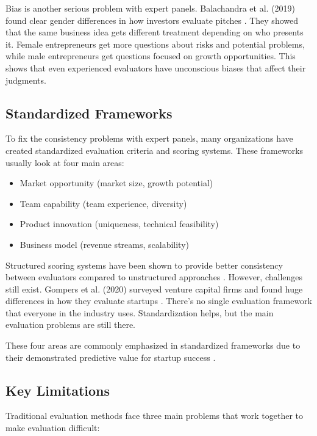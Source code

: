 Bias is another serious problem with expert panels. Balachandra et al. (2019) found clear gender differences in how investors evaluate pitches \cite{Balachandra2019}. They showed that the same business idea gets different treatment depending on who presents it. Female entrepreneurs get more questions about risks and potential problems, while male entrepreneurs get questions focused on growth opportunities. This shows that even experienced evaluators have unconscious biases that affect their judgments.

\subsection{Standardized Frameworks}\label{subsec:standardized-frameworks}
To fix the consistency problems with expert panels, many organizations have created standardized evaluation criteria and scoring systems. These frameworks usually look at four main areas:
\begin{itemize}
    \item Market opportunity (market size, growth potential)
    \item Team capability (team experience, diversity)
    \item Product innovation (uniqueness, technical feasibility)
    \item Business model (revenue streams, scalability)
\end{itemize}

Structured scoring systems have been shown to provide better consistency between evaluators compared to unstructured approaches \cite{Tsay2021VISUALSDI}. However, challenges still exist. Gompers et al. (2020) surveyed venture capital firms and found huge differences in how they evaluate startups \cite{Gompers2020}. There's no single evaluation framework that everyone in the industry uses. Standardization helps, but the main evaluation problems are still there.

These four areas are commonly emphasized in standardized frameworks due to their demonstrated predictive value for startup success \cite{Kalvapalle2024}.

\subsection{Key Limitations}\label{subsec:key-limitations}
Traditional evaluation methods face three main problems that work together to make evaluation difficult:

